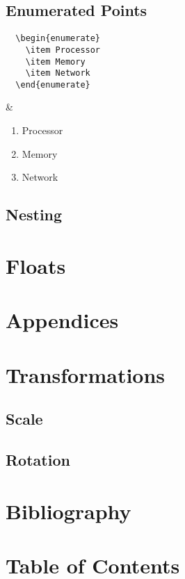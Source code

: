 \subsection{Enumerated Points}


\begin{latexdemo}
  \begin{verbatim}
  \begin{enumerate}
    \item Processor
    \item Memory
    \item Network
  \end{enumerate}
  \end{verbatim}
  &
  \begin{enumerate}
    \item Processor
    \item Memory
    \item Network
  \end{enumerate}
\end{latexdemo}

\subsection{Nesting}

\section{Floats}

\section{Appendices}

\section{Transformations}
\subsection{Scale}
\subsection{Rotation}

\section{Bibliography}
\section{Table of Contents}
